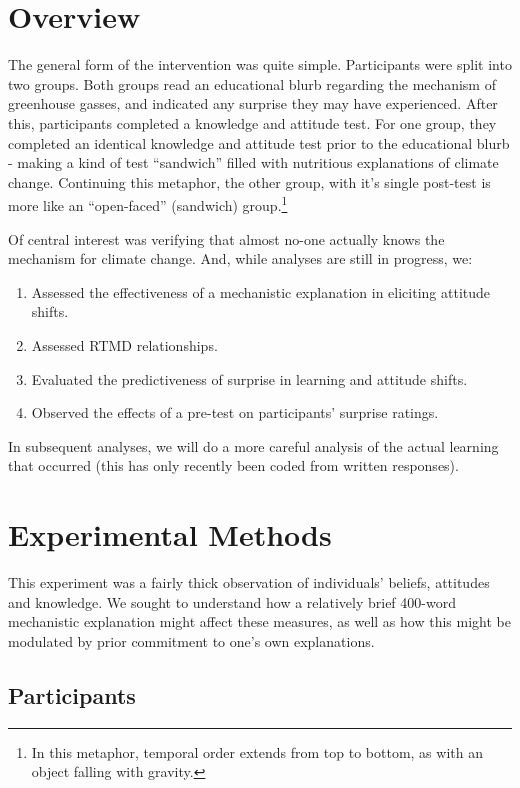 \section{Overview}

The general form of the intervention was quite simple. Participants were split
into two groups. Both groups read an educational blurb regarding the mechanism
of greenhouse gasses, and indicated any surprise they may have experienced.
After this, participants completed a knowledge and attitude test. For one group,
they completed an identical knowledge and attitude test prior to the educational
blurb - making a kind of test ``sandwich'' filled with nutritious explanations
of climate change. Continuing this metaphor, the other group, with it's single
post-test is more like an ``open-faced'' (sandwich) group.\footnote{In this
    metaphor, temporal order extends from top to bottom, as with an object
    falling with gravity.}

Of central interest was verifying that almost no-one actually knows the
mechanism for climate change. And, while analyses are still in progress, we:

\begin{enumerate}
    \item Assessed the effectiveness of a mechanistic explanation in eliciting
        attitude shifts.
    \item Assessed RTMD relationships.
    \item Evaluated the predictiveness of surprise in learning and attitude shifts.
    \item Observed the effects of a pre-test on participants' surprise ratings.
\end{enumerate}

In subsequent analyses, we will do a more careful analysis of the actual
learning that occurred (this has only recently been coded from written responses).


\section{Experimental Methods}

This experiment was a fairly thick observation of individuals' beliefs,
attitudes and knowledge. We sought to understand how a relatively brief 400-word
mechanistic explanation might affect these measures, as well as how this might
be modulated by prior commitment to one's own explanations.

\subsection{Participants}


